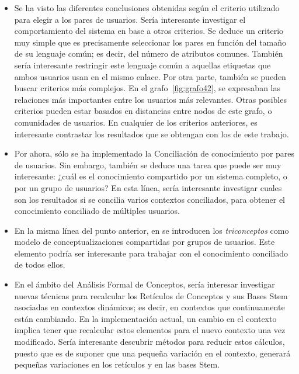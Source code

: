 \begin{itemize}

	\item Se ha visto las diferentes conclusiones obtenidas según el criterio utilizado para elegir a los pares de usuarios. Sería interesante investigar el comportamiento del sistema en base a otros criterios. Se deduce un criterio muy simple que es precisamente seleccionar los pares en función del tamaño de su lenguaje común; es decir, del número de atributos comunes. También sería interesante restringir este lenguaje común a aquellas etiquetas que ambos usuarios usan en el mismo enlace. Por otra parte, también se pueden buscar criterios más complejos. En el grafo~\ref{fig:grafo42}, se expresaban las relaciones más importantes entre los usuarios más relevantes. Otras posibles criterios pueden estar basados en distancias entre nodos de este grafo, o comunidades de usuarios. En cualquier de los criterios anteriores, es interesante contrastar los resultados que se obtengan con los de este trabajo.

	\item Por ahora, sólo se ha implementado la Conciliación de conocimiento por pares de usuarios. Sin embargo, también se deduce una tarea que puede ser muy interesante: ¿cuál es el conocimiento compartido por un sistema completo, o por un grupo de usuarios? En esta línea, sería interesante investigar cuales son los resultados si se concilia varios contextos conciliados, para obtener el conocimiento conciliado de múltiples usuarios.

	\item En la misma línea del punto anterior, en \cite{jaschke} se introducen los \emph{triconceptos} como modelo de conceptualizaciones compartidas por grupos de usuarios. Este elemento podría ser interesante para trabajar con el conocimiento conciliado de todos ellos. 

	\item En el ámbito del Análisis Formal de Conceptos, sería interesar investigar nuevas técnicas para recalcular los Retículos de Conceptos y sus Bases Stem asociadas en contextos dinámicos; es decir, en contextos que continuamente están cambiando. En la implementación actual, un cambio en el contexto implica tener que recalcular estos elementos para el nuevo contexto una vez modificado. Sería interesante descubrir métodos para reducir estos cálculos, puesto que es de suponer que una pequeña variación en el contexto, generará pequeñas variaciones en los retículos y en las bases Stem.


\end{itemize}
